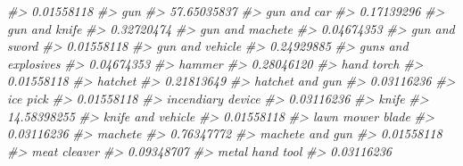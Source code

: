 \documentclass[
  12pt,
  openany]{book}
\newenvironment{Shaded}{\begin{snugshade}}{\end{snugshade}}
\newcommand{\CommentTok}[1]{\textcolor[rgb]{0.37,0.37,0.37}{\textit{#1}}}
\begin{document}
\begin{Shaded}
\begin{Highlighting}[]
\CommentTok{\#\textgreater{}                       0.01558118 }
\CommentTok{\#\textgreater{}                              gun }
\CommentTok{\#\textgreater{}                      57.65035837 }
\CommentTok{\#\textgreater{}                      gun and car }
\CommentTok{\#\textgreater{}                       0.17139296 }
\CommentTok{\#\textgreater{}                    gun and knife }
\CommentTok{\#\textgreater{}                       0.32720474 }
\CommentTok{\#\textgreater{}                  gun and machete }
\CommentTok{\#\textgreater{}                       0.04674353 }
\CommentTok{\#\textgreater{}                    gun and sword }
\CommentTok{\#\textgreater{}                       0.01558118 }
\CommentTok{\#\textgreater{}                  gun and vehicle }
\CommentTok{\#\textgreater{}                       0.24929885 }
\CommentTok{\#\textgreater{}              guns and explosives }
\CommentTok{\#\textgreater{}                       0.04674353 }
\CommentTok{\#\textgreater{}                           hammer }
\CommentTok{\#\textgreater{}                       0.28046120 }
\CommentTok{\#\textgreater{}                       hand torch }
\CommentTok{\#\textgreater{}                       0.01558118 }
\CommentTok{\#\textgreater{}                          hatchet }
\CommentTok{\#\textgreater{}                       0.21813649 }
\CommentTok{\#\textgreater{}                  hatchet and gun }
\CommentTok{\#\textgreater{}                       0.03116236 }
\CommentTok{\#\textgreater{}                         ice pick }
\CommentTok{\#\textgreater{}                       0.01558118 }
\CommentTok{\#\textgreater{}                incendiary device }
\CommentTok{\#\textgreater{}                       0.03116236 }
\CommentTok{\#\textgreater{}                            knife }
\CommentTok{\#\textgreater{}                      14.58398255 }
\CommentTok{\#\textgreater{}                knife and vehicle }
\CommentTok{\#\textgreater{}                       0.01558118 }
\CommentTok{\#\textgreater{}                 lawn mower blade }
\CommentTok{\#\textgreater{}                       0.03116236 }
\CommentTok{\#\textgreater{}                          machete }
\CommentTok{\#\textgreater{}                       0.76347772 }
\CommentTok{\#\textgreater{}                  machete and gun }
\CommentTok{\#\textgreater{}                       0.01558118 }
\CommentTok{\#\textgreater{}                     meat cleaver }
\CommentTok{\#\textgreater{}                       0.09348707 }
\CommentTok{\#\textgreater{}                  metal hand tool }
\CommentTok{\#\textgreater{}                       0.03116236 }

\end{Highlighting}
\end{Shaded}
\end{document}
